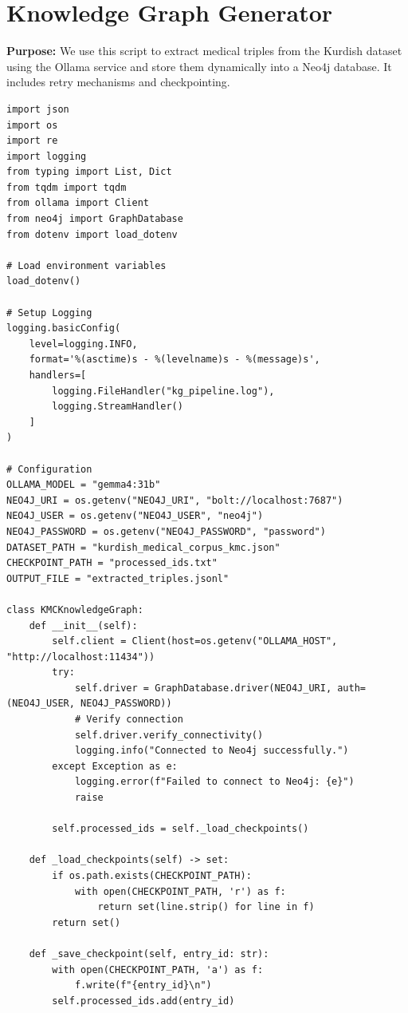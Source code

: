 \documentclass[11pt]{article}
\begin{document}
\clearpage

\section{Knowledge Graph Generator} \label{sec:generator}
\textbf{Purpose:} We use this script to extract medical triples from the Kurdish dataset using the Ollama service and store them dynamically into a Neo4j database. It includes retry mechanisms and checkpointing.

\begin{lstlisting}[style=pythoncode, caption={kg\_generator.py}]
import json
import os
import re
import logging
from typing import List, Dict
from tqdm import tqdm
from ollama import Client
from neo4j import GraphDatabase
from dotenv import load_dotenv

# Load environment variables
load_dotenv()

# Setup Logging
logging.basicConfig(
    level=logging.INFO,
    format='%(asctime)s - %(levelname)s - %(message)s',
    handlers=[
        logging.FileHandler("kg_pipeline.log"),
        logging.StreamHandler()
    ]
)

# Configuration
OLLAMA_MODEL = "gemma4:31b"
NEO4J_URI = os.getenv("NEO4J_URI", "bolt://localhost:7687")
NEO4J_USER = os.getenv("NEO4J_USER", "neo4j")
NEO4J_PASSWORD = os.getenv("NEO4J_PASSWORD", "password")
DATASET_PATH = "kurdish_medical_corpus_kmc.json"
CHECKPOINT_PATH = "processed_ids.txt"
OUTPUT_FILE = "extracted_triples.jsonl"

class KMCKnowledgeGraph:
    def __init__(self):
        self.client = Client(host=os.getenv("OLLAMA_HOST", "http://localhost:11434"))
        try:
            self.driver = GraphDatabase.driver(NEO4J_URI, auth=(NEO4J_USER, NEO4J_PASSWORD))
            # Verify connection
            self.driver.verify_connectivity()
            logging.info("Connected to Neo4j successfully.")
        except Exception as e:
            logging.error(f"Failed to connect to Neo4j: {e}")
            raise

        self.processed_ids = self._load_checkpoints()

    def _load_checkpoints(self) -> set:
        if os.path.exists(CHECKPOINT_PATH):
            with open(CHECKPOINT_PATH, 'r') as f:
                return set(line.strip() for line in f)
        return set()

    def _save_checkpoint(self, entry_id: str):
        with open(CHECKPOINT_PATH, 'a') as f:
            f.write(f"{entry_id}\n")
        self.processed_ids.add(entry_id)


\end{lstlisting}
\end{document}
